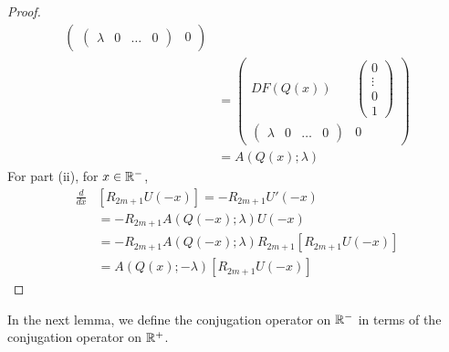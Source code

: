 \documentclass[thesis.tex]{subfiles}
\begin{document}
\begin{lemma}
\begin{proof}
\begin{align*}
\begin{pmatrix}
\begin{pmatrix} \lambda & 0 & \dots & 0 \end{pmatrix} & 0
\end{pmatrix} \\
&= \begin{pmatrix}
DF(Q(x)) & \begin{pmatrix} 0 \\ \vdots \\ 0 \\ 1 \end{pmatrix} \\
\begin{pmatrix} \lambda & 0 & \dots & 0 \end{pmatrix} & 0
\end{pmatrix} \\ 
&= A(Q(x); \lambda)
\end{align*}
For part (ii), for $x \in \mathbb{R}^-$,
\begin{align*}
\frac{d}{dx} &\left[ R_{2m+1} U(-x) \right] = -R_{2m+1} U'(-x) \\
&= -R_{2m+1} A(Q(-x); \lambda) U(-x) \\
&= -R_{2m+1} A(Q(-x); \lambda) R_{2m+1} [ R_{2m+1} U(-x)] \\
&= A(Q(x); -\lambda) [R_{2m+1} U(-x)]
\end{align*}
\end{proof}
\end{lemma}

In the next lemma, we define the conjugation operator on $\mathbb{R}^-$ in terms of the conjugation operator on $\mathbb{R}^+$.
\end{document}
